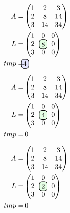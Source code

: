 \documentclass[aspectratio=169,hyperref={pdfpagelabels=false}]{beamer}
\begin{document}
\begin{frame}
    \begin{align*}
        A &= \begin{pmatrix}
            1 &  2 & 3\\
            2 &  8 & 14\\
            3 & 14 & 34
        \end{pmatrix}\\
        L &= \begin{pmatrix}
            1 & 0 & 0\\
            2 & \tocalculate{8} & 0\\
            3 & 0 & 0
        \end{pmatrix}\\
        tmp &= \hlight{4}
    \end{align*}
\end{frame}

\begin{frame}
    \begin{align*}
        A &= \begin{pmatrix}
            1 &  2 & 3\\
            2 &  8 & 14\\
            3 & 14 & 34
        \end{pmatrix}\\
        L &= \begin{pmatrix}
            1 & 0 & 0\\
            2 & \tocalculate{4} & 0\\
            3 & 0 & 0
        \end{pmatrix}\\
        tmp &= 0
    \end{align*}
\end{frame}


\begin{frame}
    \begin{align*}
        A &= \begin{pmatrix}
            1 &  2 & 3\\
            2 &  8 & 14\\
            3 & 14 & 34
        \end{pmatrix}\\
        L &= \begin{pmatrix}
            1 & 0 & 0\\
            2 & \tocalculate{2} & 0\\
            3 & 0 & 0
        \end{pmatrix}\\
        tmp &= 0
    \end{align*}
\end{frame}
\end{document}
